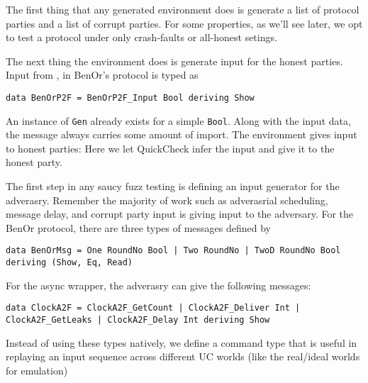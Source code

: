 The first thing that any generated environment does is generate a list of protocol parties and a list of corrupt parties. For some properties, as we'll see later, we opt to test a protocol under only crash-faults or all-honest setings. 

The next thing the environment does is generate input for the honest parties.
Input from \Z, in BenOr's protocol is typed as
\begin{lstlisting}
data BenOrP2F = BenOrP2F_Input Bool deriving Show
\end{lstlisting}
An instance of \texttt{Gen} already exists for a simple \texttt{Bool}. 
Along with the input data, the message always carries some amount of import.
The environment gives input to honest parties:
Here we let QuickCheck infer the input and give it to the honest party. 

The first step in any saucy fuzz testing is defining an input generator for the adverasry. 
Remember the majority of work such as adverasrial scheduling, message delay, and corrupt party input \Z is giving input to the adversary. 	
For the BenOr protocol, there are three types of messages defined by
\begin{lstlisting}
data BenOrMsg = One RoundNo Bool | Two RoundNo | TwoD RoundNo Bool deriving (Show, Eq, Read)
\end{lstlisting}
For the async wrapper, the adverasry can give the following messages:
\begin{lstlisting}
data ClockA2F = ClockA2F_GetCount | ClockA2F_Deliver Int | ClockA2F_GetLeaks | ClockA2F_Delay Int deriving Show
\end{lstlisting}
Instead of using these types natively, we define a command type that is useful in replaying an input sequence across different UC worlds (like the real/ideal worlds for emulation)


